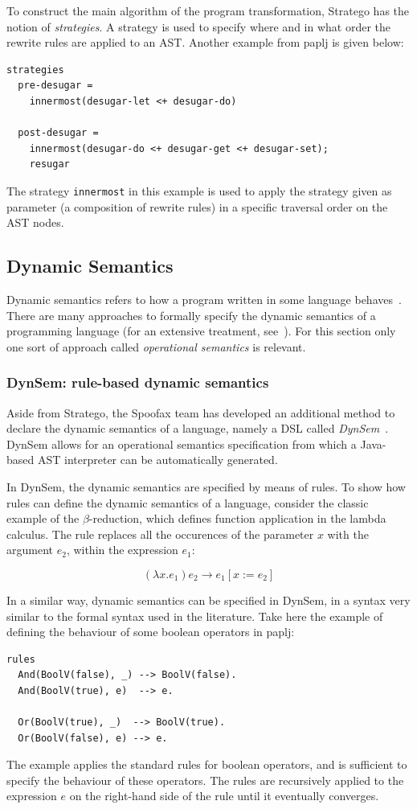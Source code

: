 To construct the main algorithm of the program transformation,
Stratego has the notion of \emph{strategies}. A strategy is used to specify
where and in what order the rewrite rules are applied to an
AST. Another example from paplj is given below:
\lstset{language=stratego,numbers=left}
\begin{lstlisting}
strategies
  pre-desugar =
    innermost(desugar-let <+ desugar-do)

  post-desugar =
    innermost(desugar-do <+ desugar-get <+ desugar-set);
    resugar
\end{lstlisting}
The strategy \texttt{innermost} in this example is used to apply the strategy
given as parameter (a composition of rewrite rules) in a specific
traversal order on the AST nodes.
\subsection{Dynamic Semantics}
\label{sec:dynamic-semantics}
Dynamic semantics refers to how a program written in some language
behaves~\cite{Winskel93}. There are many approaches to formally
specify the dynamic semantics of a programming language (for an
extensive treatment, see~\cite{Winskel93}). For this section only
one sort of approach called \emph{operational semantics} is relevant.
\subsubsection{DynSem: rule-based dynamic semantics}
\label{ssec:dynsem}
Aside from Stratego, the Spoofax team has developed an additional
method to declare the dynamic semantics of a language, namely a DSL
called \emph{DynSem}~\cite{VerguNV15}. DynSem allows for an operational
semantics specification from which a Java-based AST interpreter can be
automatically generated.

In DynSem, the dynamic semantics are specified by means of rules. To
show how rules can define the dynamic semantics of a language,
consider the classic example of the \(\beta\)-reduction, which defines
function application in the lambda calculus. The rule replaces all the
occurences of the parameter \(x\) with the argument \(e_2\), within the
expression \(e_1\):

\begin{equation}
(\lambda x.e_1) e_2 \rightarrow e_1[x := e_2]
\end{equation}

In a similar way, dynamic semantics can be specified in DynSem, in a
syntax very similar to the formal syntax used in the literature. Take
here the example of defining the behaviour of some boolean operators
in paplj:
\lstset{language=dynsem,numbers=left}
\begin{lstlisting}
rules
  And(BoolV(false), _) --> BoolV(false). 
  And(BoolV(true), e)  --> e.
   
  Or(BoolV(true), _)  --> BoolV(true).
  Or(BoolV(false), e) --> e.
\end{lstlisting}
The example applies the standard rules for boolean operators, and is
sufficient to specify the behaviour of these operators. The rules are
recursively applied to the expression \(e\) on the right-hand side of
the rule until it eventually converges.
\lstset{numbers=none}

